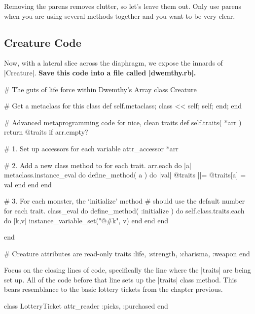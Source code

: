 \documentclass[12pt,twoside]{report}
\begin{document}
Removing the parens removes clutter, so let's leave them out.  Only
use parens when you are using several methods together and you want to
be very clear.



\subsection{Creature Code}



Now, with a lateral slice across the diaphragm, we expose the innards
of \rubyinline|Creature|.  {\bf Save this code into a
  file called \rubyinline|dwemthy.rb|.}


\begin{rubycode}

 # The guts of life force within Dwemthy's Array
 class Creature

   # Get a metaclass for this class
   def self.metaclass; class << self; self; end; end

   # Advanced metaprogramming code for nice, clean traits
   def self.traits( *arr )
     return @traits if arr.empty?

     # 1. Set up accessors for each variable
     attr_accessor *arr

     # 2. Add a new class method to for each trait.
     arr.each do |a|
       metaclass.instance_eval do
         define_method( a ) do |val|
           @traits ||= {}
           @traits[a] = val
         end
       end
     end

     # 3. For each monster, the `initialize' method
     #    should use the default number for each trait.
     class_eval do
       define_method( :initialize ) do
         self.class.traits.each do |k,v|
           instance_variable_set("@#{k}", v)
         end
       end
     end

   end

   # Creature attributes are read-only
   traits :life, :strength, :charisma, :weapon
 end

\end{rubycode}


Focus on the closing lines of code, specifically the line where the
\rubyinline|traits| are being set up.  All of the code
before that line sets up the \rubyinline|traits| class
method.  This bears resemblance to the basic lottery tickets from the
chapter previous.


\begin{rubycode}

 class LotteryTicket
   attr_reader :picks, :purchased
 end

\end{rubycode}
\end{document}
